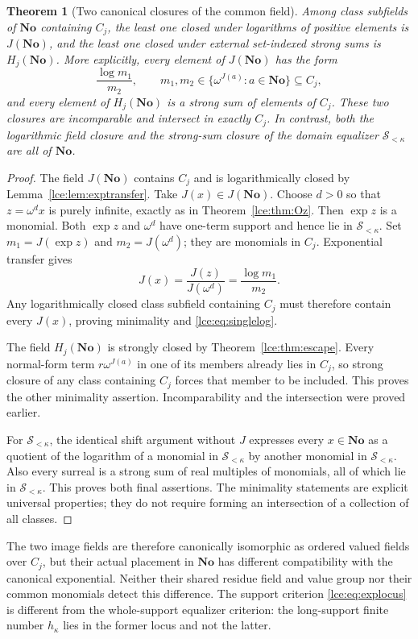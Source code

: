 \documentclass[11pt,letterpaper]{article}
\numberwithin{equation}{section}
\newtheorem{theorem}{Theorem}[section]
\theoremstyle{definition}
\theoremstyle{remark}
\newcommand{\No}{\mathbf{No}}
\newcommand{\Sk}{\mathscr S_{<\kappa}}
\newcommand{\Common}{C_j}
\newcommand{\thref}[1]{Theorem~\ref{#1}}
\newcommand{\leref}[1]{Lemma~\ref{#1}}
\begin{document}
\begin{theorem}[Two canonical closures of the common field]\label{lce:thm:twoclosures}
Among class subfields of $\No$ containing $\Common$, the least one closed
under logarithms of positive elements is $J(\No)$, and the least one
closed under external set-indexed strong sums is $H_j(\No)$.
More explicitly, every element of $J(\No)$ has the form
\begin{equation}\label{lce:eq:singlelog}
 \frac{\log m_1}{m_2},
 \qquad m_1,m_2\in\{\omega^{J(a)}:a\in\No\}\subseteq\Common,
\end{equation}
and every element of $H_j(\No)$ is a strong sum of elements of
$\Common$. These two closures are incomparable and intersect in exactly
$\Common$.
In contrast, both the logarithmic field closure and the strong-sum closure
of the domain equalizer $\Sk$ are all of $\No$.
\end{theorem}
\begin{proof}
The field $J(\No)$ contains $\Common$ and is logarithmically closed by
\leref{lce:lem:exptransfer}. Take $J(x)\in J(\No)$.
Choose $d>0$ so that $z=\omega^d x$ is purely infinite, exactly as in
\thref{lce:thm:Oz}. Then $\exp z$ is a monomial. Both $\exp z$ and
$\omega^d$ have one-term support and hence lie in $\Sk$.
Set $m_1=J(\exp z)$ and $m_2=J(\omega^d)$; they are monomials in
$\Common$. Exponential transfer gives
\[
 J(x)=\frac{J(z)}{J(\omega^d)}=\frac{\log m_1}{m_2}.
\]
Any logarithmically closed class subfield containing $\Common$ must
therefore contain every $J(x)$, proving minimality and
\eqref{lce:eq:singlelog}.

The field $H_j(\No)$ is strongly closed by \thref{lce:thm:escape}. Every
normal-form term $r\omega^{J(a)}$ in one of its members already lies in
$\Common$, so strong closure of any class containing $\Common$ forces
that member to be included. This proves the other minimality assertion.
Incomparability and the intersection were proved earlier.

For $\Sk$, the identical shift argument without $J$ expresses every
$x\in\No$ as a quotient of the logarithm of a monomial in $\Sk$ by
another monomial in $\Sk$. Also every surreal is a strong sum of real
multiples of monomials, all of which lie in $\Sk$. This proves both
final assertions. The minimality statements are explicit universal
properties; they do not require forming an intersection of a collection
of all classes.
\end{proof}

The two image fields are therefore canonically isomorphic as ordered
valued fields over $\Common$, but their actual placement in $\No$ has
different compatibility with the canonical exponential. Neither their
shared residue field and value group nor their common monomials detect
this difference. The support criterion \eqref{lce:eq:explocus} is different
from the whole-support equalizer criterion: the long-support finite
number $h_\kappa$ lies in the former locus and not the latter.
\end{document}
